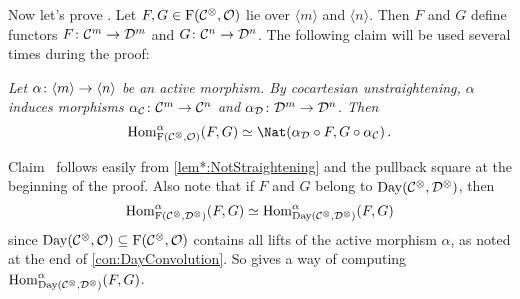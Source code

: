 \begin{proof*}
	Now let's prove . Let $F,G\in \operatorname{F}(\mathcal{C}^\otimes,\mathcal{O})$ lie over $\langle m\rangle$ and $\langle n\rangle$. Then $F$ and $G$ define functors $F\colon \Cc^m\morphism\Dd^m$ and $G\colon \Cc^n\morphism\Dd^n$. The following claim will be used several times during the proof:
	\begin{alphanumerate}
		\item[\itememph{\boxtimes}] \itshape Let $\alpha\colon \langle m\rangle\morphism\langle n\rangle$ be an active morphism. By cocartesian unstraightening, $\alpha$ induces morphisms $\alpha_\Cc\colon \Cc^m\morphism\Cc^n$ and $\alpha_\Dd\colon \Dd^m\morphism\Dd^n$. Then
		\begin{equation*}
			\Hom_{\F(\Cc^\otimes,\Oo)}^\alpha(F,G)\simeq \Nat(\alpha_\Dd\circ F,G\circ \alpha_\Cc)\,.
		\end{equation*}
	\end{alphanumerate}
	Claim~\itememph{\boxtimes} follows easily from \cref{lem*:NotStraightening} and the pullback square at the beginning of the proof. Also note that if $F$ and $G$ belong to $\operatorname{Day}(\mathcal{C}^\otimes,\mathcal{D}^\otimes)$, then
	\begin{equation*}
		\operatorname{Hom}_{\operatorname{F}(\mathcal{C}^\otimes,\mathcal{D}^\otimes)}^\alpha(F,G)\simeq\operatorname{Hom}_{\operatorname{Day}(\mathcal{C}^\otimes,\mathcal{D}^\otimes)}^\alpha(F,G)
	\end{equation*}
	since $\operatorname{Day}(\mathcal{C}^\otimes,\mathcal{O})\subseteq \operatorname{F}(\mathcal{C}^\otimes,\mathcal{O})$ contains all lifts of the active morphism $\alpha$, as noted at the end of \cref{con:DayConvolution}. So \itememph{\boxtimes} gives a way of computing $\operatorname{Hom}_{\operatorname{Day}(\mathcal{C}^\otimes,\mathcal{D}^\otimes)}^\alpha(F,G)$.
	

\end{proof*}
